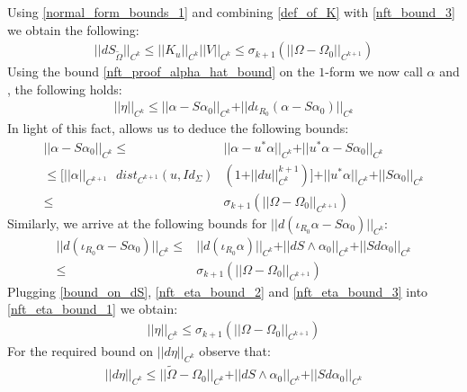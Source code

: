 \documentclass[11pt]{amsart}
\theoremstyle{plain}
\theoremstyle{definition}
\theoremstyle{remark}
\begin{document}
Using \eqref{normal_form_bounds_1} and combining \eqref{def_of_K} with \eqref{nft_bound_3} we obtain the following:
\begin{align}\label{bound_on_dS}
    \vert\vert dS_{\tilde{\Omega}}\vert\vert_{C^k} \leq \vert\vert K_u\vert\vert_{C^k} \vert\vert V\vert\vert_{C^k} \leq \sigma_{k+1}(\vert\vert \Omega - \Omega_0\vert\vert_{C^{k+1}})
\end{align}
Using the bound \eqref{nft_proof_alpha_hat_bound} on the $1$-form we now call $\alpha$ and \cite[Lemma 1.3]{Abbondandolo-Benedetti}, the following holds:
\begin{align}\label{nft_eta_bound_1}
    \vert\vert \eta\vert\vert_{C^k} \leq \vert\vert \alpha -S\alpha_0\vert\vert_{C^k} + \vert\vert d\iota_{R_0}( \alpha -S\alpha_0)\vert\vert_{C^k}
\end{align}
In light of this fact, \cite[Lemma 1.1]{Abbondandolo-Benedetti} allows us to deduce the following bounds:
\begin{align}\label{nft_eta_bound_2}
     \vert\vert\alpha -S\alpha_0\vert\vert_{C^k} \leq &\vert\vert\alpha - u^*\alpha\vert\vert_{C^k} + \vert\vert u^*\alpha - S\alpha_0\vert\vert_{C^k} \\ \nonumber \leq \Big[\vert\vert\alpha\vert\vert_{C^{k+1}} \text{ } dist_{C^{k+1}}(u,Id_{\Sigma})&(1+\vert\vert du\vert\vert^{k+1}_{C^k}) \Big] + \vert\vert u^*\alpha\vert\vert_{C^k} + \vert\vert S\alpha_0\vert\vert_{C^k} \\\nonumber \leq &\sigma_{k+1}(\vert\vert\Omega -\Omega_0\vert\vert_{C^{k+1}})
\end{align}
Similarly, we arrive at the following bounds for $\vert\vert d(\iota_{R_0} \alpha -S\alpha_0)\vert\vert_{C^k}$:
\begin{align}\label{nft_eta_bound_3}
    \vert\vert d(\iota_{R_0} \alpha -S\alpha_0)\vert\vert_{C^k} \leq &\vert\vert d(\iota_{R_0}\alpha)\vert\vert_{C^k} + \vert\vert dS \wedge \alpha_0 \vert\vert_{C^k} + \vert\vert S d\alpha_0\vert\vert_{C^k} \\\nonumber \leq &\sigma_{k+1}(\vert\vert \Omega -\Omega_0\vert\vert_{C^{k+1}})
\end{align}
Plugging \eqref{bound_on_dS}, \eqref{nft_eta_bound_2} and \eqref{nft_eta_bound_3} into \eqref{nft_eta_bound_1} we obtain:
\begin{align}
    \vert\vert \eta\vert\vert_{C^k} \leq \sigma_{k+1}(\vert\vert \Omega -\Omega_0\vert\vert_{C^{k+1}})
\end{align}
For the required bound on $\vert\vert d\eta\vert\vert_{C^k}$ observe that:
\begin{align}\label{d_eta_bounds}
    \vert\vert d\eta\vert\vert_{C^{k}} \leq \vert\vert \tilde{\Omega} - \Omega_0\vert\vert_{C^{k}} + \vert\vert dS\wedge \alpha_0\vert\vert_{C^{k}} + \vert\vert Sd\alpha_0\vert\vert_{C^{k}}
\end{align}
\end{document}
